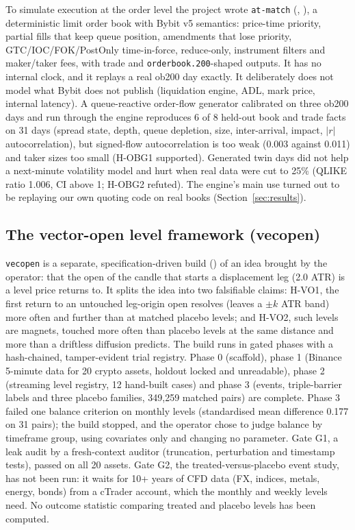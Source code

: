 \documentclass[10pt,a4paper]{article}
\newcommand{\hyp}[1]{\textsf{#1}}
\begin{document}
To simulate execution at the order level the project wrote \texttt{at-match} (\protect{}, \protect{}), a deterministic limit order book with Bybit v5 semantics: price-time priority, partial fills that keep queue position, amendments that lose priority, GTC/IOC/FOK/PostOnly time-in-force, reduce-only, instrument filters and maker/taker fees, with trade and \texttt{orderbook.200}-shaped outputs. It has no internal clock, and it replays a real ob200 day exactly. It deliberately does not model what Bybit does not publish (liquidation engine, ADL, mark price, internal latency). A queue-reactive order-flow generator calibrated on three ob200 days and run through the engine reproduces 6 of 8 held-out book and trade facts on 31 days (spread state, depth, queue depletion, size, inter-arrival, impact, $|r|$ autocorrelation), but signed-flow autocorrelation is too weak (0.003 against 0.011) and taker sizes too small (\hyp{H-OBG1} supported). Generated twin days did not help a next-minute volatility model and hurt when real data were cut to 25\% (QLIKE ratio 1.006, CI above 1; \hyp{H-OBG2} refuted). The engine's main use turned out to be replaying our own quoting code on real books (Section~\ref{sec:results}).

\subsection{The vector-open level framework (vecopen)}

\texttt{vecopen} is a separate, specification-driven build (\protect{}) of an idea brought by the operator: that the open of the candle that starts a displacement leg (2.0 ATR) is a level price returns to. It splits the idea into two falsifiable claims: \hyp{H-VO1}, the first return to an untouched leg-origin open resolves (leaves a $\pm k$ ATR band) more often and further than at matched placebo levels; and \hyp{H-VO2}, such levels are magnets, touched more often than placebo levels at the same distance and more than a driftless diffusion predicts. The build runs in gated phases with a hash-chained, tamper-evident trial registry. Phase 0 (scaffold), phase 1 (Binance 5-minute data for 20 crypto assets, holdout locked and unreadable), phase 2 (streaming level registry, 12 hand-built cases) and phase 3 (events, triple-barrier labels and three placebo families, 349,259 matched pairs) are complete. Phase 3 failed one balance criterion on monthly levels (standardised mean difference 0.177 on 31 pairs); the build stopped, and the operator chose to judge balance by timeframe group, using covariates only and changing no parameter. Gate G1, a leak audit by a fresh-context auditor (truncation, perturbation and timestamp tests), passed on all 20 assets. Gate G2, the treated-versus-placebo event study, has not been run: it waits for 10+ years of CFD data (FX, indices, metals, energy, bonds) from a cTrader account, which the monthly and weekly levels need. No outcome statistic comparing treated and placebo levels has been computed.
\end{document}
